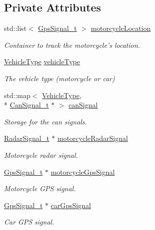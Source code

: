 \subsection*{Private Attributes}
\begin{DoxyCompactItemize}
\item 
std\-::list$<$ \hyperlink{structGpsSignal__t}{Gps\-Signal\-\_\-t} $>$ \hyperlink{classMotorcycleAwarenessSystem_af6becfeb1d11b467cb80a94a8e6940ac}{motorcycle\-Location}
\begin{DoxyCompactList}\small\item\em Container to track the motorcycle's location. \end{DoxyCompactList}\item 
\hyperlink{MotorcycleAwarenessSystemTypes_8hpp_a0c05c42b98a847f971385c81c2a81afa}{Vehicle\-Type} \hyperlink{classMotorcycleAwarenessSystem_a977b2085bfbf6a62902bf2d80160e6d2}{vehicle\-Type}
\begin{DoxyCompactList}\small\item\em The vehicle type (motorcycle or car) \end{DoxyCompactList}\item 
std\-::map$<$ \hyperlink{MotorcycleAwarenessSystemTypes_8hpp_a0c05c42b98a847f971385c81c2a81afa}{Vehicle\-Type}, \\*
\hyperlink{structCanSignal__t}{Can\-Signal\-\_\-t} $\ast$ $>$ \hyperlink{classMotorcycleAwarenessSystem_a2d8ac602ae24dcf38aaa95a42ffb4e1f}{can\-Signal}
\begin{DoxyCompactList}\small\item\em Storage for the can signals. \end{DoxyCompactList}\item 
\hyperlink{structRadarSignal__t}{Radar\-Signal\-\_\-t} $\ast$ \hyperlink{classMotorcycleAwarenessSystem_a0744e71b9f440a86f5078c876ba7629b}{motorcycle\-Radar\-Signal}
\begin{DoxyCompactList}\small\item\em Motorcycle radar signal. \end{DoxyCompactList}\item 
\hyperlink{structGpsSignal__t}{Gps\-Signal\-\_\-t} $\ast$ \hyperlink{classMotorcycleAwarenessSystem_ab281a3993b574923b2f379ed0477b2d4}{motorcycle\-Gps\-Signal}
\begin{DoxyCompactList}\small\item\em Motorcycle G\-P\-S signal. \end{DoxyCompactList}\item 
\hyperlink{structGpsSignal__t}{Gps\-Signal\-\_\-t} $\ast$ \hyperlink{classMotorcycleAwarenessSystem_a9a8185e00b60d0be58bfa76166063128}{car\-Gps\-Signal}
\begin{DoxyCompactList}\small\item\em Car G\-P\-S signal. \end{DoxyCompactList}\end{DoxyCompactItemize}
